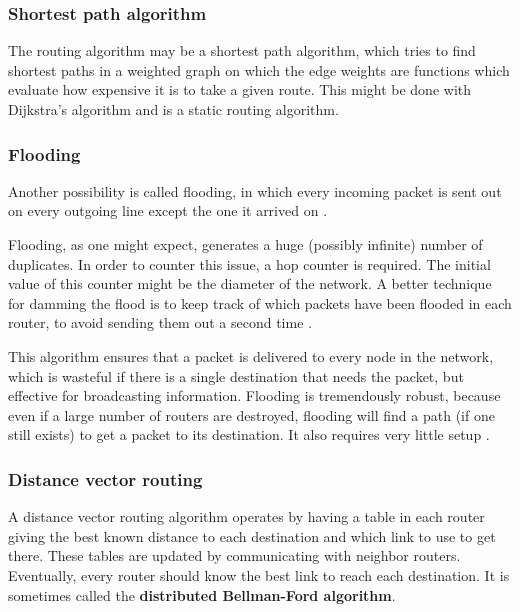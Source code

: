 \documentclass[12pt, oneside]{book}
\begin{document}
\subsubsection{Shortest path algorithm}

The routing algorithm may be a shortest path algorithm, which tries to find shortest paths in a weighted graph on which the edge weights are functions which evaluate how expensive it is to take a given route.
This might be done with Dijkstra's algorithm and is a static routing algorithm.

\subsubsection{Flooding}

Another possibility is called flooding, in which every incoming packet is sent out on every outgoing line except the one it arrived on \cite[p.~368]{computer-networks-tanenbaum-2012}.

Flooding, as one might expect, generates a huge (possibly infinite) number of duplicates. In order to counter this issue, a hop counter is required. The initial value of this counter might be the diameter of the network. A better technique for damming the flood is to keep track of which packets have been flooded in each router, to avoid sending them out a second time \cite[p.~368]{computer-networks-tanenbaum-2012}.

This algorithm ensures that a packet is delivered to every node in the network, which is wasteful if there is a single destination that needs the packet, but effective for broadcasting information. Flooding is tremendously robust, because even if a large number of routers are destroyed, flooding will find a path (if one still exists) to get a packet to its destination. It also requires very little setup \cite[p.~370]{computer-networks-tanenbaum-2012}.

\subsubsection{Distance vector routing}

A distance vector routing algorithm operates by having a table in each router giving the best known distance to each destination and which link to use to get there.
These tables are updated by communicating with neighbor routers.
Eventually, every router should know the best link to reach each destination.
It is sometimes called the \textbf{distributed Bellman-Ford algorithm}.
\end{document}
